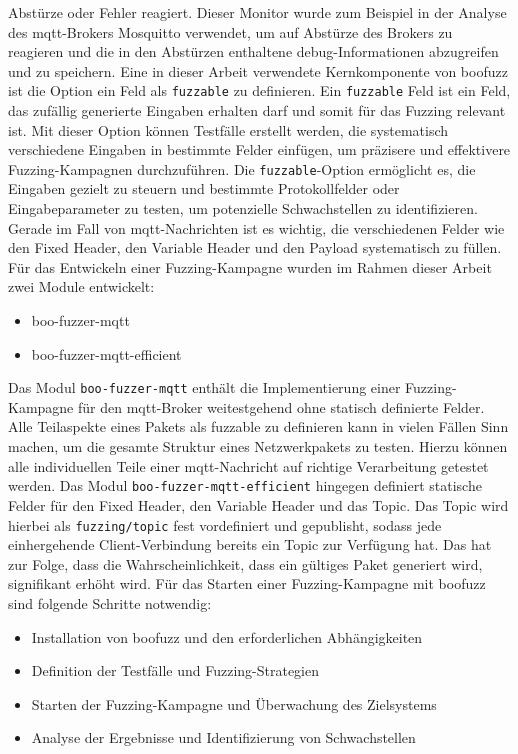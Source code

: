 Abstürze oder Fehler reagiert.
Dieser Monitor wurde zum Beispiel in der Analyse des \gls{mqtt}-Brokers Mosquitto verwendet, um auf Abstürze des Brokers
zu reagieren und die in den Abstürzen enthaltene debug-Informationen abzugreifen und zu speichern.
\newline\newline
Eine in dieser Arbeit verwendete Kernkomponente von boofuzz ist die Option ein Feld als \texttt{fuzzable} zu definieren.
Ein \texttt{fuzzable} Feld ist ein Feld, das zufällig generierte Eingaben erhalten darf und somit für das Fuzzing relevant ist.
Mit dieser Option können Testfälle erstellt werden, die systematisch verschiedene Eingaben in bestimmte Felder einfügen,
um präzisere und effektivere Fuzzing-Kampagnen durchzuführen.
Die \texttt{fuzzable}-Option ermöglicht es, die Eingaben gezielt zu steuern und bestimmte Protokollfelder oder Eingabeparameter
zu testen, um potenzielle Schwachstellen zu identifizieren.
Gerade im Fall von \gls{mqtt}-Nachrichten ist es wichtig, die verschiedenen Felder wie den Fixed Header, den Variable Header
und den Payload systematisch zu füllen.
\newline\newline
Für das Entwickeln einer Fuzzing-Kampagne wurden im Rahmen dieser Arbeit zwei Module entwickelt:
\begin{itemize}
    \item boo-fuzzer-mqtt
    \item boo-fuzzer-mqtt-efficient
\end{itemize}
Das Modul \texttt{boo-fuzzer-mqtt} enthält die Implementierung einer Fuzzing-Kampagne für den \gls{mqtt}-Broker weitestgehend
ohne statisch definierte Felder.
Alle Teilaspekte eines Pakets als fuzzable zu definieren kann in vielen Fällen Sinn machen, um die gesamte Struktur eines
Netzwerkpakets zu testen.
Hierzu können alle individuellen Teile einer \gls{mqtt}-Nachricht auf richtige Verarbeitung getestet werden.\newline
Das Modul \texttt{boo-fuzzer-mqtt-efficient} hingegen definiert statische Felder für den Fixed Header, den Variable Header
und das Topic.
Das Topic wird hierbei als \texttt{fuzzing/topic} fest vordefiniert und gepublisht, sodass jede einhergehende Client-Verbindung
bereits ein Topic zur Verfügung hat.
Das hat zur Folge, dass die Wahrscheinlichkeit, dass ein gültiges Paket generiert wird, signifikant erhöht wird.
Für das Starten einer Fuzzing-Kampagne mit boofuzz sind folgende Schritte notwendig:
\begin{itemize}
    \item Installation von boofuzz und den erforderlichen Abhängigkeiten
    \item Definition der Testfälle und Fuzzing-Strategien
    \item Starten der Fuzzing-Kampagne und Überwachung des Zielsystems
    \item Analyse der Ergebnisse und Identifizierung von Schwachstellen
\end{itemize}

